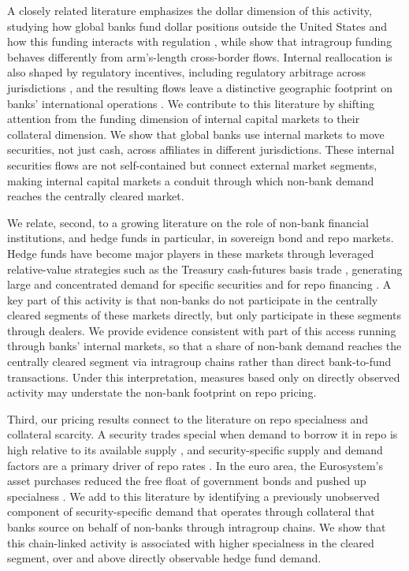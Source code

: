 \documentclass[english, 11pt, oneside, legal]{article}
\begin{document}
A closely related literature emphasizes the dollar dimension of this activity, studying how global banks fund dollar positions outside the United States and how this funding interacts with regulation \citep{aldasoro2022, lu2024}, while \citet{reinhardt2015} show that intragroup funding behaves differently from arm's-length cross-border flows. Internal reallocation is also shaped by regulatory incentives, including regulatory arbitrage across jurisdictions \citep{houston2012}, and the resulting flows leave a distinctive geographic footprint on banks' international operations \citep{hardy2024}. We contribute to this literature by shifting attention from the funding dimension of internal capital markets to their collateral dimension. We show that global banks use internal markets to move securities, not just cash, across affiliates in different jurisdictions. These internal securities flows are not self-contained but connect external market segments, making internal capital markets a conduit through which non-bank demand reaches the centrally cleared market.

We relate, second, to a growing literature on the role of non-bank financial institutions, and hedge funds in particular, in sovereign bond and repo markets. Hedge funds have become major players in these markets through leveraged relative-value strategies such as the Treasury cash-futures basis trade \citep{barth2025, kruttli2025, pelizzon2025}, generating large and concentrated demand for specific securities and for repo financing \citep{banegas2021, aramonte2022}. A key part of this activity is that non-banks do not participate in the centrally cleared segments of these markets directly, but only participate in these segments through dealers. We provide evidence consistent with part of this access running through banks' internal markets, so that a share of non-bank demand reaches the centrally cleared segment via intragroup chains rather than direct bank-to-fund transactions. Under this interpretation, measures based only on directly observed activity may understate the non-bank footprint on repo pricing.

Third, our pricing results connect to the literature on repo specialness and collateral scarcity. A security trades special when demand to borrow it in repo is high relative to its available supply \citep{duffie1996}, and security-specific supply and demand factors are a primary driver of repo rates \citep{dAmico2018}. In the euro area, the Eurosystem's asset purchases reduced the free float of government bonds and pushed up specialness \citep{arrata2020, corradin2020, pelizzon2025}. We add to this literature by identifying a previously unobserved component of security-specific demand that operates through collateral that banks source on behalf of non-banks through intragroup chains. We show that this chain-linked activity is associated with higher specialness in the cleared segment, over and above directly observable hedge fund demand.
\end{document}
